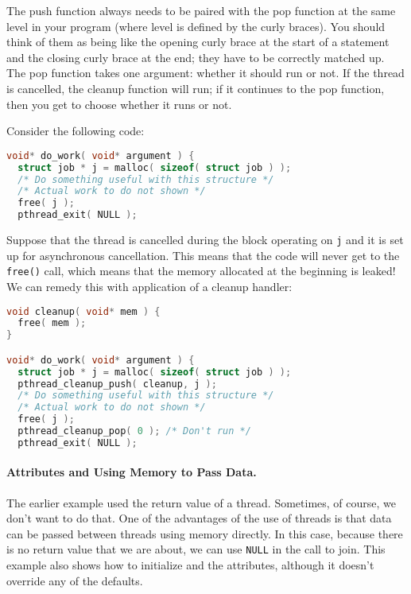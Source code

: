 The push function always needs to be paired with the pop function at the same level in your program (where level is defined by the curly braces). You should think of them as being like the opening curly brace at the start of a statement and the closing curly brace at the end; they have to be correctly matched up. The pop function takes one argument: whether it should run or not. If the thread is cancelled, the cleanup function will run; if it continues to the pop function, then you get to choose whether it runs or not.

Consider the following code: 
\begin{lstlisting}[language=C]
void* do_work( void* argument ) {
  struct job * j = malloc( sizeof( struct job ) );
  /* Do something useful with this structure */
  /* Actual work to do not shown */
  free( j );
  pthread_exit( NULL );
\end{lstlisting}

Suppose that the thread is cancelled during the block operating on \texttt{j} and it is set up for asynchronous cancellation. This means that the code will never get to the \texttt{free()} call, which means that the memory allocated at the beginning is leaked! We can remedy this with application of a cleanup handler:
\begin{lstlisting}[language=C]
void cleanup( void* mem ) {
  free( mem );
}

void* do_work( void* argument ) {
  struct job * j = malloc( sizeof( struct job ) );
  pthread_cleanup_push( cleanup, j );
  /* Do something useful with this structure */
  /* Actual work to do not shown */
  free( j );
  pthread_cleanup_pop( 0 ); /* Don't run */
  pthread_exit( NULL );
\end{lstlisting}

\paragraph{Attributes and Using Memory to Pass Data.}
The earlier example used the return value of a thread. Sometimes, of course, we don't want to do that. One of the advantages of the use of threads is that data can be passed between threads using memory directly. In this case, because there is no return value that we are about, we can use \texttt{NULL} in the call to join. This example also shows how to initialize and the attributes, although it doesn't override any of the defaults.


